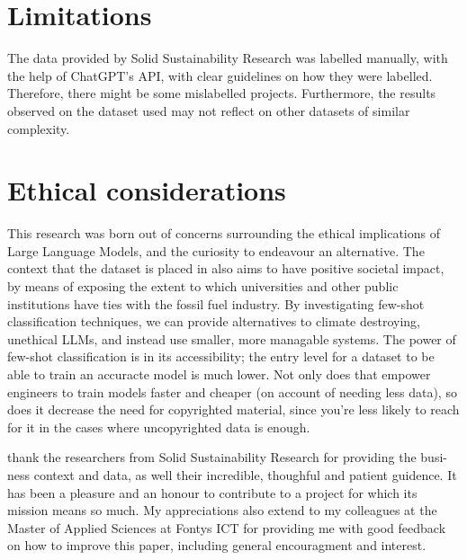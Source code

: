 \documentclass[manuscript, anonymous=true, review=true]{acmart}
\begin{document}
\section{Limitations}

The data provided by Solid Sustainability Research was labelled manually, with the help of ChatGPT's
API, with clear guidelines on how they were labelled. Therefore, there might be some mislabelled
projects. Furthermore, the results observed on the dataset used may not reflect on other datasets of
similar complexity.
\section{Ethical considerations}
This research was born out of concerns surrounding the ethical implications of Large Language Models, and the curiosity to endeavour an alternative. The
context that the dataset is placed in also aims to have positive societal impact, by means of exposing the extent to which universities and other public institutions
have ties with the fossil fuel industry.
By investigating few-shot classification techniques, we can provide alternatives to climate destroying, unethical LLMs, and instead use smaller, more managable systems. The power of few-shot classification is in its accessibility; the entry
level for a dataset to be able to train an accuracte model is much lower. Not only does that empower engineers to train models faster and cheaper (on account of needing less data), so does it decrease the need for copyrighted material, since you're less likely to reach for it in the cases where uncopyrighted data is enough.
\begin{acks}
 thank the researchers from Solid Sustainability Research for providing the busi-
ness context and data, as well their incredible, thoughful and patient guidence.
It has been a pleasure and an honour to contribute to a project for which its
mission means so much. My appreciations also extend to my colleagues at the
Master of Applied Sciences at Fontys ICT for providing me with good feedback
on how to improve this paper, including general encouragment and interest.
\end{acks}



\end{document}
